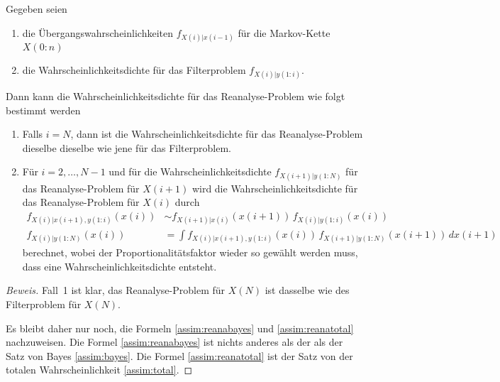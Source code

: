 \begin{satz}[Reanalyse]
\label{satz:reanalyse}
Gegeben seien
\begin{enumerate}
\item
die Übergangswahrscheinlichkeiten $f_{X(i)|x(i-1)}$ für die
Markov-Kette $X(0:n)$
\item
die Wahrscheinlichkeitsdichte für das Filterproblem
$f_{X(i)|y(1:i)}$.
\end{enumerate}
Dann kann die Wahrscheinlichkeitsdichte für das Reanalyse-Problem wie folgt
bestimmt werden
\begin{enumerate}
\item Falls $i=N$, dann ist die Wahrscheinlichkeitsdichte für das
Reanalyse-Problem dieselbe dieselbe wie jene für das Filterproblem.
\item Für $i=2,\dots,N-1$ und für die Wahrscheinlichkeitsdichte 
$f_{X(i+1)|y(1:N)}$  für das Reanalyse-Problem für $X(i+1)$ 
wird die Wahrscheinlichkeitsdichte für das Reanalyse-Problem für $X(i)$
durch
\begin{align}
f_{X(i)|x(i+1),y(1:i)}(x(i))
&\sim
f_{X(i+1)|x(i)}(x(i+1))\, f_{X(i)|y(1:i)}(x(i))
\label{assim:reanabayes}
\\
f_{X(i)|y(1:N)}(x(i))
&=
\int f_{X(i)|x(i+1),y(1:i)}(x(i))\, f_{X(i+1)|y(1:N)}(x(i+1))\,dx(i+1)
\label{assim:reanatotal}
\end{align}
berechnet,
wobei der Proportionalitätsfaktor wieder so gewählt werden muss, dass
eine Wahrscheinlichkeitsdichte entsteht.
\end{enumerate}
\end{satz}

\begin{proof}[Beweis]
Fall~1 ist klar, das Reanalyse-Problem für $X(N)$ ist dasselbe wie des
Filterproblem für $X(N)$.

Es bleibt daher nur noch, die Formeln
\eqref{assim:reanabayes}
und
\eqref{assim:reanatotal}
nachzuweisen.
Die Formel
\eqref{assim:reanabayes}
ist nichts anderes als der 
als der Satz von Bayes
\eqref{assim:bayes}.
Die Formel 
\eqref{assim:reanatotal}
ist der Satz von der totalen Wahrscheinlichkeit
\eqref{assim:total}.
\end{proof}






